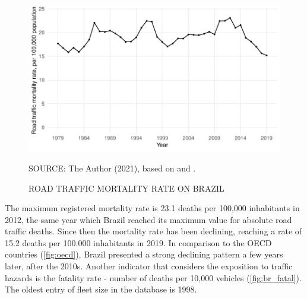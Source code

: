 
\begin{figure}[!htbp]
    \centering\footnotesize
    \captionsetup{font=footnotesize}
    \caption{ROAD TRAFFIC MORTALITY RATE ON BRAZIL}
    \includegraphics{fig/brazil_mort.pdf}
    \label{fig:br_mort}
    \par SOURCE: The Author (2021), based on \textcite{MinistryofHealth2020} and \textcite{MinistryofHealth2021}.
\end{figure}


The maximum registered mortality rate is 23.1 deaths per 100,000 inhabitants in 2012, the same year which Brazil reached its maximum value for absolute road traffic deaths. Since then the mortality rate has been declining, reaching a rate of 15.2 deaths per 100.000 inhabitants in 2019. In comparison to the OECD countries (\autoref{fig:oecd}), Brazil presented a strong declining pattern a few years later, after the 2010s. Another indicator that considers the exposition to traffic hazards is the fatality rate - number of deaths per 10,000 vehicles (\autoref{fig:br_fatal}). The oldest entry of fleet size in the \textcite{DENATRAN2020} database is 1998.

